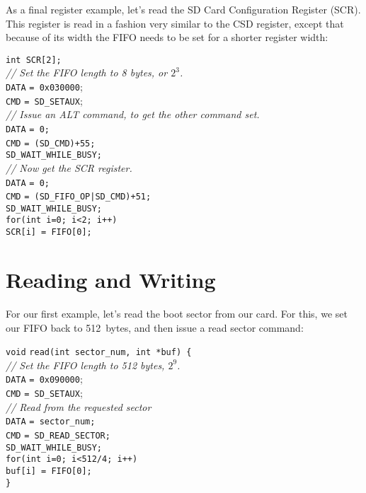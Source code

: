 \documentclass{gqtekspec}
\begin{document}
As a final register example, let's read the SD Card Configuration Register
(SCR).  This register is read in a fashion very similar to the CSD register,
except that because of its width the FIFO needs to be set for a shorter
register width:
\begin{tabbing}
{\tt int SCR[2];}\\
{\em // Set the FIFO length to 8 bytes, or $2^3$.}\\
{\tt DATA} \= {\tt = 0x030000}; \\
{\tt CMD} \> {\tt = SD\_SETAUX};\\
{\em // Issue an ALT command, to get the other command set.}\\
{\tt DATA} \= {\tt = 0;} \\
{\tt CMD} \> {\tt = (SD\_CMD)+55;}\\
{\tt SD\_WAIT\_WHILE\_BUSY;} \\
{\em // Now get the SCR register.}\\
{\tt DATA} \= {\tt = 0;} \\
{\tt CMD} \> {\tt = (SD\_FIFO\_OP|SD\_CMD)+51;}\\
{\tt SD\_WAIT\_WHILE\_BUSY;} \\
{\tt for(int i=0; i<2; i++) } \\
\> {\tt SCR[i] = FIFO[0];}\\
\end{tabbing}


\section{Reading and Writing}

For our first example, let's read the boot sector from our card.  For this,
we set our FIFO back to 512~bytes, and then issue a read sector command:
\begin{tabbing}
{\tt void} \= {\tt read(int sector\_num, int *buf) \{}\\
\> {\em // Set the FIFO length to 512 bytes, $2^9$.}\\
\> {\tt DATA} \= {\tt = 0x090000}; \\
\> {\tt CMD} \> {\tt = SD\_SETAUX};\\
\> {\em // Read from the requested sector}\\
\> {\tt DATA} \= {\tt = sector\_num;} \\
\> {\tt CMD} \> {\tt = SD\_READ\_SECTOR;}\\
\> {\tt SD\_WAIT\_WHILE\_BUSY;} \\
\> {\tt for(int i=0; i<512/4; i++) } \\
\> \> {\tt buf[i] = FIFO[0];}\\
{\tt \}}
\end{tabbing}
\end{document}
